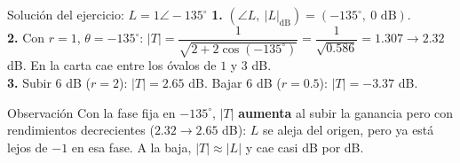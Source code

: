 \documentclass[aspectratio=169,11pt]{beamer}
\begin{document}
\begin{frame}{Solución del ejercicio: $L=1\angle-135^\circ$}
  \small
  \textbf{1.} $(\angle L,\ |L|_{\text{dB}})=(-135^\circ,\ 0\text{ dB})$.\\[3pt]
  \textbf{2.} Con $r=1$, $\theta=-135^\circ$: $|T|=\dfrac{1}{\sqrt{2+2\cos(-135^\circ)}}=\dfrac{1}{\sqrt{0.586}}=1.307\to2.32$ dB. En la carta cae entre los óvalos de $1$ y $3$ dB.\\[3pt]
  \textbf{3.} Subir $6$ dB ($r=2$): $|T|=2.65$ dB. Bajar $6$ dB ($r=0.5$): $|T|=-3.37$ dB.\\[6pt]
  \begin{block}{Observación}
    Con la fase fija en $-135^\circ$, $|T|$ \textbf{aumenta} al subir la ganancia pero con rendimientos decrecientes ($2.32\to2.65$ dB): $L$ se aleja del origen, pero ya está lejos de $-1$ en esa fase. A la baja, $|T|\approx|L|$ y cae casi dB por dB.
  \end{block}
\end{frame}
\end{document}
